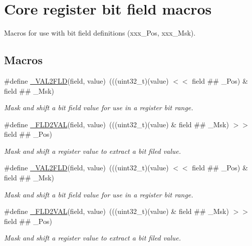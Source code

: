 \hypertarget{group___c_m_s_i_s__core__bitfield}{}\section{Core register bit field macros}
\label{group___c_m_s_i_s__core__bitfield}


Macros for use with bit field definitions (xxx\+\_\+\+Pos, xxx\+\_\+\+Msk).  


\subsection*{Macros}
\begin{DoxyCompactItemize}
\item 
\#define \mbox{\hyperlink{group___c_m_s_i_s__core__bitfield_ga286e3b913dbd236c7f48ea70c8821f4e}{\+\_\+\+V\+A\+L2\+F\+LD}}(field,  value)~(((uint32\+\_\+t)(value) $<$$<$ field \#\# \+\_\+\+Pos) \& field \#\# \+\_\+\+Msk)
\begin{DoxyCompactList}\small\item\em Mask and shift a bit field value for use in a register bit range. \end{DoxyCompactList}\item 
\#define \mbox{\hyperlink{group___c_m_s_i_s__core__bitfield_ga139b6e261c981f014f386927ca4a8444}{\+\_\+\+F\+L\+D2\+V\+AL}}(field,  value)~(((uint32\+\_\+t)(value) \& field \#\# \+\_\+\+Msk) $>$$>$ field \#\# \+\_\+\+Pos)
\begin{DoxyCompactList}\small\item\em Mask and shift a register value to extract a bit filed value. \end{DoxyCompactList}\item 
\#define \mbox{\hyperlink{group___c_m_s_i_s__core__bitfield_ga286e3b913dbd236c7f48ea70c8821f4e}{\+\_\+\+V\+A\+L2\+F\+LD}}(field,  value)~(((uint32\+\_\+t)(value) $<$$<$ field \#\# \+\_\+\+Pos) \& field \#\# \+\_\+\+Msk)
\begin{DoxyCompactList}\small\item\em Mask and shift a bit field value for use in a register bit range. \end{DoxyCompactList}\item 
\#define \mbox{\hyperlink{group___c_m_s_i_s__core__bitfield_ga139b6e261c981f014f386927ca4a8444}{\+\_\+\+F\+L\+D2\+V\+AL}}(field,  value)~(((uint32\+\_\+t)(value) \& field \#\# \+\_\+\+Msk) $>$$>$ field \#\# \+\_\+\+Pos)
\begin{DoxyCompactList}\small\item\em Mask and shift a register value to extract a bit filed value. \end{DoxyCompactList}\item 

\end{DoxyCompactItemize}
